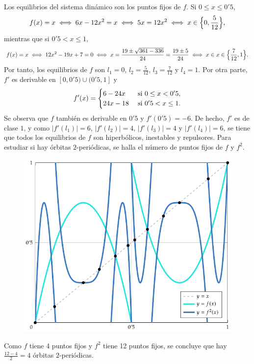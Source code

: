 \documentclass[11pt]{report}
\begin{document}
\begin{solution}
    Los equilibrios del sistema dinámico son los puntos fijos de $f$. Si $0\leq x \leq 0'5$,
    \[f(x) = x \iff 6x-12x^2 = x \iff 5x = 12x^2 \iff x \in \Bigl\{0, \frac{5}{12}\Bigr\},\]
    mientras que si $0'5 < x \leq 1$,
    \[f(x) = x \iff 12x^2 - 19x+7 = 0 \iff x = \frac{19 \pm \sqrt{361 - 336}}{24} = \frac{19 \pm 5}{24} \iff x \in x \in \Bigl\{\frac{7}{12},1\Bigr\}.\]
    Por tanto, los equilibrios de $f$ son $l_1 = 0$, $l_2 = \frac{5}{12}$, $l_3 = \frac{7}{12}$ y $l_4 = 1$. Por otra parte, $f'$ es derivable en $[0,0'5) \cup (0'5,1]$ y
    \[f'(x) = \begin{cases}
        6-24x & $ si $ 0 \leq x < 0'5, \\
        24x-18 & $ si $ 0'5 < x \leq 1.
    \end{cases}\]
    Se observa que $f$ también es derivable en $0'5$ y $f'(0'5) = -6$. De hecho, $f'$ es de clase $1$, y como $|f'(l_1)| = 6$, $|f'(l_2)| = 4$, $|f'(l_3)| = 4$ y $|f'(l_4)| = 6$, se tiene que todos los equilibrios de $f$ son hiperbólicos, inestables y repulsores. Para estudiar si hay órbitas $2$-periódicas, se halla el número de puntos fijos de $f$ y $f^2$.
    \begin{figure}[H]
        \centering
        \includegraphics{./plot1/main.pdf}
    \end{figure}
    Como $f$ tiene 4 puntos fijos y $f^2$ tiene 12 puntos fijos, se concluye que hay $\frac{12-4}{2} = 4$ órbitas $2$-periódicas.
\end{solution}
\end{document}
